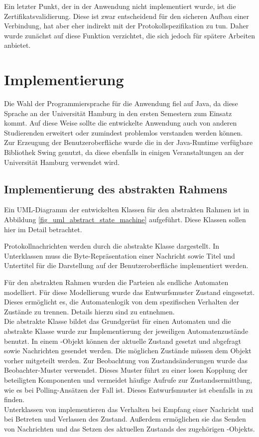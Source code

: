 Ein letzter Punkt, der in der Anwendung nicht implementiert wurde, ist die Zertifikatsvalidierung. Diese ist zwar entscheidend für den sicheren Aufbau einer Verbindung, hat aber eher indirekt mit der Protokollspezifikation zu tun. Daher wurde zunächst auf diese Funktion verzichtet, die sich jedoch für spätere Arbeiten anbietet.

\section{Implementierung}

Die Wahl der Programmiersprache für die Anwendung fiel auf Java, da diese Sprache an der Universität Hamburg in den ersten Semestern zum Einsatz kommt. Auf diese Weise sollte die entwickelte Anwendung auch von anderen Studierenden erweitert oder zumindest problemlos verstanden werden können. Zur Erzeugung der Benutzeroberfläche wurde die in der Java-Runtime verfügbare Bibliothek Swing genutzt, da diese ebenfalls in einigen Veranstaltungen an der Universität Hamburg verwendet wird.

\subsection{Implementierung des abstrakten Rahmens}

Ein UML-Diagramm der entwickelten Klassen für den abstrakten Rahmen ist in Abbildung \ref{fig_uml_abstract_state_machine} aufgeführt. Diese Klassen sollen hier im Detail betrachtet.

Protokollnachrichten werden durch die abstrakte Klasse  dargestellt. In Unterklassen muss die Byte-Repräsentation einer Nachricht sowie Titel und Untertitel für die Darstellung auf der Benutzeroberfläche implementiert werden.

Für den abstrakten Rahmen wurden die Parteien als endliche Automaten modelliert. Für diese Modellierung wurde das Entwurfsmuster Zustand eingesetzt. Dieses ermöglicht es, die Automatenlogik von dem spezifischen Verhalten der Zustände zu trennen. Details hierzu sind \cite{freeman04} zu entnehmen.\\
Die abstrakte Klasse  bildet das Grundgerüst für einen Automaten und die abstrakte Klasse  wurde zur Implementierung der jeweiligen Automatenzustände benutzt. In einem -Objekt können der aktuelle Zustand gesetzt und abgefragt sowie Nachrichten gesendet werden. Die möglichen Zustände müssen dem Objekt vorher mitgeteilt werden. Zur Beobachtung von Zustandsänderungen wurde das Beobachter-Muster verwendet. Dieses Muster führt zu einer losen Kopplung der beteiligten Komponenten und vermeidet häufige Aufrufe zur Zustandsermittlung, wie es bei Polling-Ansätzen der Fall ist. Dieses Entwurfsmuster ist ebenfalls in \cite{freeman04} zu finden.\\
Unterklassen von  implementieren das Verhalten bei Empfang einer Nachricht und bei Betreten und Verlassen des Zustand. Außerdem ermöglichen sie das Senden von Nachrichten und das Setzen des aktuellen Zustands des zugehörigen -Objekts.


